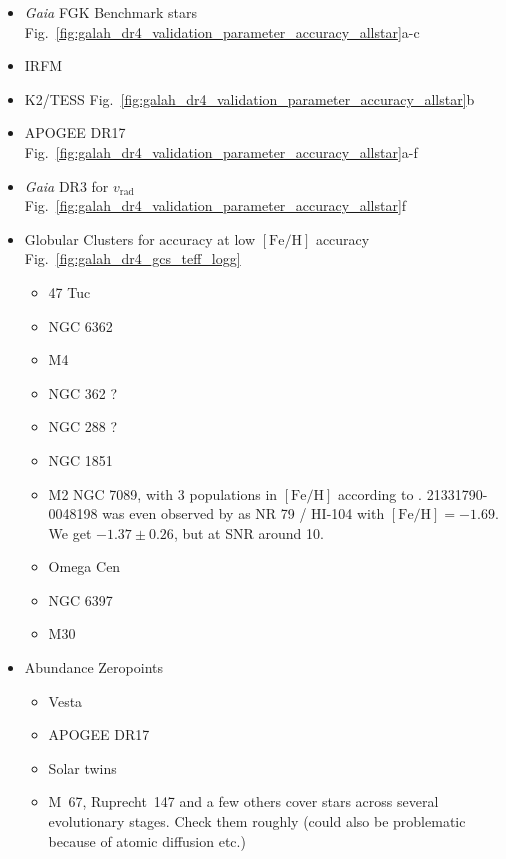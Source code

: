 \documentclass[
  journal=pasa,
  manuscript=research-paper, %
  year=2024,
  volume=37
]{cup-journal}
\newcommand{\feh}{$\mathrm{[Fe/H]}$\xspace}
\newcommand{\vrad}{$v_\mathrm{rad}$\xspace}
\newcommand{\Gaia}{\textit{Gaia}\xspace}
\begin{document}
\begin{itemize}
    \item \Gaia FGK Benchmark stars \citep{Jofre2018} Fig.~\ref{fig:galah_dr4_validation_parameter_accuracy_allstar}a-c
    \item IRFM \citep{Casagrande2020}
    \item K2/TESS \citet{Zinn2020} Fig.~\ref{fig:galah_dr4_validation_parameter_accuracy_allstar}b
    \item APOGEE DR17 Fig.~\ref{fig:galah_dr4_validation_parameter_accuracy_allstar}a-f
    \item \Gaia DR3 for \vrad Fig.~\ref{fig:galah_dr4_validation_parameter_accuracy_allstar}f
    \item Globular Clusters for accuracy at low \feh accuracy Fig.~\ref{fig:galah_dr4_gcs_teff_logg}
    \begin{itemize}
        \item 47 Tuc \citet{Carretta2009, Carretta2009b}
        \item NGC 6362
        \item M4
        \item NGC 362 \citet{Monty2023}?
        \item NGC 288 \citet{Monty2023}?
        \item NGC 1851
        \item M2 NGC 7089, with 3 populations in \feh according to \citet{Yong2014}. 21331790-0048198 was even observed by \citet{Yong2014} as NR 79 / HI-104 with $\mathrm{[Fe/H]} = -1.69$. We get $-1.37 \pm 0.26$, but at SNR around 10.
        \item Omega Cen \cite{Johnson2010}
        \item NGC 6397 \citet{Carretta2009, Carretta2009b}
        \item M30 \citet{Carretta2009, Carretta2009b}
    \end{itemize}
    \item Abundance Zeropoints
    \begin{itemize}
        \item Vesta
        \item APOGEE DR17
        \item Solar twins
        \item  M~67, Ruprecht~147 and a few others cover stars across several evolutionary stages. Check them roughly (could also be problematic because of atomic diffusion etc.)
    \end{itemize}
\end{itemize}
\end{document}
